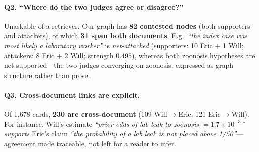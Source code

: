 \paragraph{Q2. ``Where do the two judges agree or disagree?''}
Unaskable of a retriever. Our graph has \textbf{82 contested nodes} (both supporters and
attackers), of which \textbf{31 span both documents}. E.g.\ \emph{``the index case was
most likely a laboratory worker''} is \emph{net-attacked} (supporters: 10 Eric $+$ 1 Will;
attackers: 8 Eric $+$ 2 Will; strength $0.495$), whereas both zoonosis hypotheses are
net-supported---the two judges converging on zoonosis, expressed as graph structure rather
than prose.

\paragraph{Q3. Cross-document links are explicit.}
Of 1{,}678 cards, \textbf{230 are cross-document} (109 Will$\to$Eric, 121 Eric$\to$Will).
For instance, Will's estimate \emph{``prior odds of lab leak to zoonosis $=1.7\times
10^{-3}$''} \emph{supports} Eric's claim \emph{``the probability of a lab leak is not
placed above 1/50''}---agreement made traceable, not left for a reader to infer.

